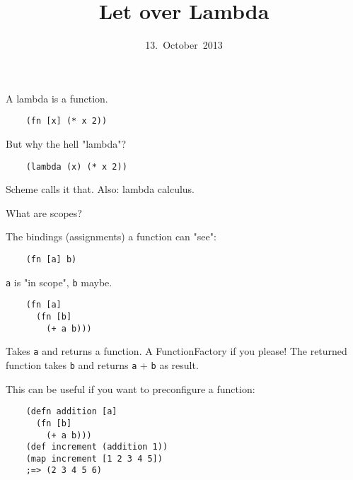 

\title{Let over Lambda}
\date{13.~October~2013}



\frame{\titlepage}


\begin{frame}[fragile]
  \begin{center}
    A lambda is a function.
  \end{center}
  \pause
  \begin{verbatim}
    (fn [x] (* x 2))
  \end{verbatim}
\end{frame}

\begin{frame}[fragile]
  \begin{center}
    But why the hell "lambda"?
  \end{center}
  \begin{verbatim}
    (lambda (x) (* x 2))
  \end{verbatim}
  \begin{center}
    Scheme calls it that. Also: lambda calculus.
  \end{center}
\end{frame}

\begin{frame}[fragile]
  What are scopes?

  \pause
  The bindings (assignments) a function can "see":

  \begin{verbatim}
    (fn [a] b)
  \end{verbatim}

  \texttt{a} is "in scope", \texttt{b} maybe.
\end{frame}


\begin{frame}[fragile]
  \begin{verbatim}
    (fn [a]
      (fn [b]
        (+ a b)))
  \end{verbatim}
  Takes \texttt{a} and returns a function. A FunctionFactory if you please!
  The returned function takes \texttt{b} and returns \texttt{a} + \texttt{b}
  as result.
\end{frame}

\begin{frame}[fragile]
  This can be useful if you want to preconfigure a function:
  \begin{verbatim}
    (defn addition [a]
      (fn [b]
        (+ a b)))
    (def increment (addition 1))
    (map increment [1 2 3 4 5])
    ;=> (2 3 4 5 6)
  \end{verbatim}
\end{frame}

